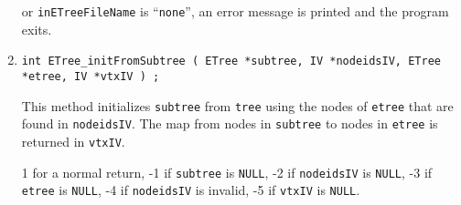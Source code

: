\begin{enumerate}
or {\tt inETreeFileName} is ``{\tt none}'',
an error message is printed and the program exits.
\item
\begin{verbatim}
int ETree_initFromSubtree ( ETree *subtree, IV *nodeidsIV, ETree *etree, IV *vtxIV ) ;
\end{verbatim}
This method initializes {\tt subtree} from {\tt tree} using the
nodes of {\tt etree} that are found in {\tt nodeidsIV}.
The map from nodes in {\tt subtree} to nodes in {\tt etree}
is returned in {\tt vtxIV}.
\par {}
1 for a normal return,
-1 if {\tt subtree} is {\tt NULL},
-2 if {\tt nodeidsIV} is {\tt NULL},
-3 if {\tt etree} is {\tt NULL},
-4 if {\tt nodeidsIV} is invalid,
-5 if {\tt vtxIV} is {\tt NULL}.
\end{enumerate}
\par
